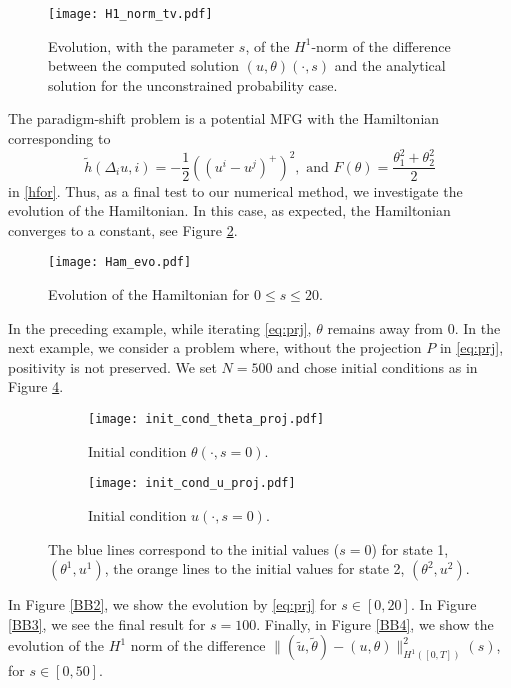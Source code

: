 \documentclass[12pt]{amsart}
\newcommand{\1}{{\chi}}
\theoremstyle{definition}
\begin{document}
                \begin{figure}
                        \centering
                        \texttt{[image: H1\_norm\_tv.pdf]}
                    \caption{Evolution, with the parameter $s$, of the $H^1$-norm of the difference between the computed solution $(u,\theta)(\cdot,s)$ and the analytical solution for the unconstrained probability case.}
                        \label{AA4}
                \end{figure}
                The paradigm-shift problem is a potential MFG with the Hamiltonian
                corresponding to
                \begin{equation*}
                \tilde h(\Delta_i u,i) = -\frac 1 2 ((u^i-u^j)^+)^2, \text{ and } F(\theta) = \frac{\theta_1^2 + \theta_2^2}{2}
                \end{equation*}
                in \eqref{hfor}.
                Thus, as a final test to our numerical method, we investigate the evolution of the Hamiltonian. 
                In this case, as expected, the Hamiltonian converges to a constant,  
                see Figure \ref{fig:cons_ham}.  
                \begin{figure} 
                        \centering
                        \texttt{[image: Ham\_evo.pdf]}
                        \caption{Evolution of the Hamiltonian for $0\leq s\leq 20$.
                                }
                        \label{fig:cons_ham}
                \end{figure}

        In the preceding example, while iterating \eqref{eq:prj},  $\theta$ remains away from $0$. 
        In the next example, we consider a problem where, without the projection $P$ in \eqref{eq:prj}, positivity is not preserved.
        We set  $N=500$ and chose initial conditions as in Figure \ref{it_cond_proj}. 
    \begin{figure}
      \centering
      \begin{subfigure}{0.5\textwidth}
          \centering
              \texttt{[image: init\_cond\_theta\_proj.pdf]}
              \caption{Initial condition $\theta(\cdot,s=0)$.}
             \label{fig:it_cond}
      \end{subfigure}
      \begin{subfigure}{0.5\textwidth}
      \centering
        \texttt{[image: init\_cond\_u\_proj.pdf]}
        \caption{Initial condition $u(\cdot,s=0)$.}
      \end{subfigure}
      \caption{The blue lines correspond to the initial values ($s=0$) for state 1, $(\theta^1,u^1)$, the orange lines to the initial values for state 2, $(\theta^2,u^2)$.}
      \label{it_cond_proj}
    \end{figure}
        In Figure \ref{BB2}, we show the evolution by \eqref{eq:prj} for $s\in[0,20]$.
        In Figure \ref{BB3}, we see the final result for $s=100$. 
    Finally, in Figure \ref{BB4}, we show the evolution of the $H^1$ norm of the difference $\|(\tilde u, \tilde \theta) - (u,\theta) \|_{H^1([0,T])}^2(s)$, for $s\in[0,50]$.
              
\end{document}
